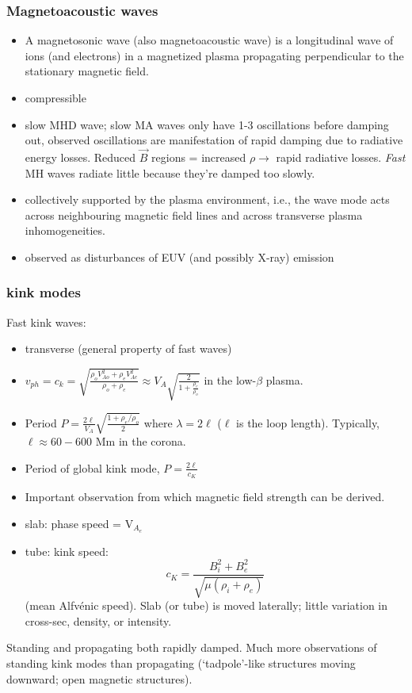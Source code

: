 \documentclass{article}
\begin{document}
\subsubsection{Magnetoacoustic waves}
\begin{itemize}
    \item A magnetosonic wave (also magnetoacoustic wave) is a
        longitudinal wave of ions (and electrons) in a magnetized
        plasma propagating perpendicular to the stationary magnetic field.
    \item compressible
    \item slow MHD wave; slow MA waves only have 1-3 oscillations before
        damping out, observed oscillations are manifestation of rapid
        damping due to radiative energy losses. Reduced $\vec{B}$ regions
        = increased $\rho\rightarrow$ rapid radiative losses. \emph{Fast}
        MH waves radiate little because they're damped too slowly.
    \item collectively supported by the plasma environment, i.e., the wave mode acts
        across neighbouring magnetic field lines and across transverse
        plasma inhomogeneities.
    \item observed as disturbances of EUV (and possibly X-ray) emission
\end{itemize}
\subsubsection{kink modes}
Fast kink waves:
\begin{itemize}
    \item transverse (general property of fast waves)
    \item $v_{ph} = c_k = \sqrt{\frac{\rho_oV^2_{Ao}+\rho_eV^2_{Ae}}
        {\rho_o+\rho_e}} \approx V_A\sqrt{\frac{2}{1+\frac{\rho_e}{\rho_o}}} $
        in the low-$\beta$ plasma.
    \item Period $P=\frac{2\ell}{V_A}\sqrt{\frac{1+\rho_e/\rho_o}{2}}$
        where $\lambda=2\ell$ ($\ell$ is the loop length).
        Typically, $\ell \approx 60-600$ Mm in the corona.
    \item Period of global kink mode, $P = \frac{2\ell}{c_K}$
    \item Important observation from which magnetic field strength
        can be derived.
    \item slab: phase speed = V$_{A_e}$
    \item tube: kink speed:
        $$ c_K = \frac{B_i^2 + B_e^2}{\sqrt{\mu(\rho_i+\rho_e)}} $$
        (mean Alfv\'enic speed).
        Slab (or tube) is moved laterally; little variation in cross-sec,
        density, or intensity.
\end{itemize}
Standing and propagating both rapidly damped. Much more observations of
standing kink modes than propagating (`tadpole'-like structures moving
downward; open magnetic structures).
\end{document}
